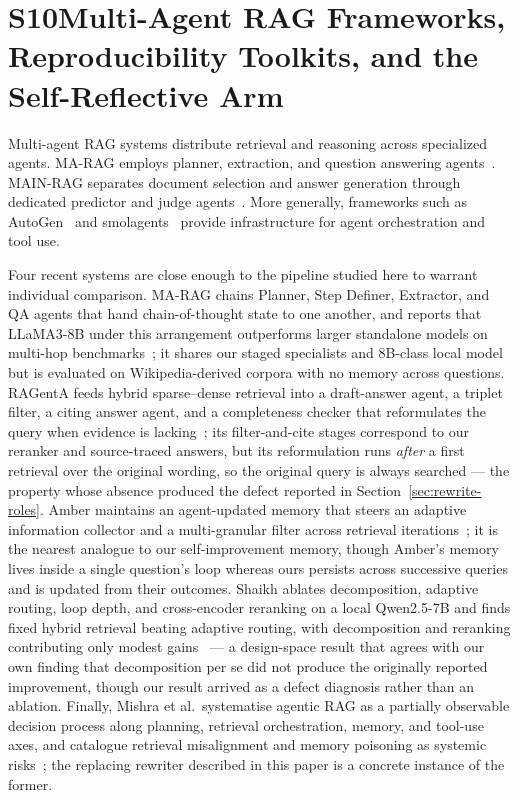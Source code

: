 \documentclass[acmsmall,anonymous,screen]{acmart}
\begin{document}
\section*{S10\quad Multi-Agent RAG Frameworks, Reproducibility Toolkits, and the Self-Reflective Arm}

Multi-agent RAG systems distribute retrieval and reasoning across
specialized agents. MA-RAG employs planner, extraction, and question
answering agents~\cite{nguyen2025marag}. MAIN-RAG separates document
selection and answer generation through dedicated predictor and judge
agents~\cite{wang2024mainrag}. More generally, frameworks such as
AutoGen~\cite{wu2023autogen} and smolagents~\cite{huggingface2024agents}
provide infrastructure for agent orchestration and tool use.

Four recent systems are close enough to the pipeline studied here to warrant
individual comparison. MA-RAG chains Planner, Step Definer, Extractor, and QA
agents that hand chain-of-thought state to one another, and reports that
LLaMA3-8B under this arrangement outperforms larger standalone models on
multi-hop benchmarks~\cite{nguyen2025marag}; it shares our staged specialists
and 8B-class local model but is evaluated on Wikipedia-derived corpora with no
memory across questions. RAGentA feeds hybrid sparse--dense retrieval into a
draft-answer agent, a triplet filter, a citing answer agent, and a completeness
checker that reformulates the query when evidence is
lacking~\cite{besrour2025ragenta}; its filter-and-cite stages correspond to our
reranker and source-traced answers, but its reformulation runs \emph{after} a
first retrieval over the original wording, so the original query is always
searched --- the property whose absence produced the defect reported in
Section~\ref{sec:rewrite-roles}. Amber maintains an agent-updated memory that steers
an adaptive information collector and a multi-granular filter across retrieval
iterations~\cite{qin2025amber}; it is the nearest analogue to our
self-improvement memory, though Amber's memory lives inside a single question's
loop whereas ours persists across successive queries and is updated from their
outcomes. Shaikh ablates decomposition, adaptive routing, loop depth, and
cross-encoder reranking on a local Qwen2.5-7B and finds fixed hybrid retrieval
beating adaptive routing, with decomposition and reranking contributing only
modest gains~\cite{shaikh2026dissecting} --- a design-space result that agrees
with our own finding that decomposition per se did not produce the originally
reported improvement, though our result arrived as a defect diagnosis rather
than an ablation. Finally, Mishra et al.\ systematise agentic RAG as a
partially observable decision process along planning, retrieval orchestration,
memory, and tool-use axes, and catalogue retrieval misalignment and memory
poisoning as systemic risks~\cite{mishra2026sok}; the replacing rewriter
described in this paper is a concrete instance of the former.
\end{document}
